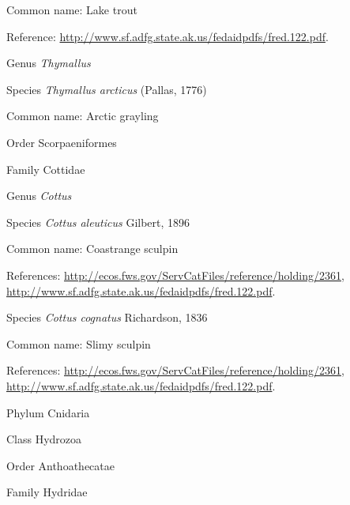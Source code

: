\documentclass[9pt, article]{memoir}
\begin{document}
\begin{multicols}{2}
Common name: Lake trout

Reference: 
\url{http://www.sf.adfg.state.ak.us/fedaidpdfs/fred.122.pdf}.

\vspace{6pt}\noindent\hspace{30pt}Genus \textit{Thymallus}


\vspace{6pt}\noindent\hspace{36pt}Species \textit{Thymallus arcticus} (Pallas, 1776)


Common name: Arctic grayling

\vspace{6pt}\noindent\hspace{18pt}Order Scorpaeniformes


\vspace{6pt}\noindent\hspace{24pt}Family Cottidae


\vspace{6pt}\noindent\hspace{30pt}Genus \textit{Cottus}


\vspace{6pt}\noindent\hspace{36pt}Species \textit{Cottus aleuticus} Gilbert, 1896


Common name: Coastrange sculpin

References: 
\url{http://ecos.fws.gov/ServCatFiles/reference/holding/2361}, 
\url{http://www.sf.adfg.state.ak.us/fedaidpdfs/fred.122.pdf}.

\vspace{6pt}\noindent\hspace{36pt}Species \textit{Cottus cognatus} Richardson, 1836


Common name: Slimy sculpin

References: 
\url{http://ecos.fws.gov/ServCatFiles/reference/holding/2361}, 
\url{http://www.sf.adfg.state.ak.us/fedaidpdfs/fred.122.pdf}.

\vspace{6pt}\noindent\hspace{6pt}Phylum Cnidaria


\vspace{6pt}\noindent\hspace{12pt}Class Hydrozoa


\vspace{6pt}\noindent\hspace{18pt}Order Anthoathecatae


\vspace{6pt}\noindent\hspace{24pt}Family Hydridae



\end{multicols}
\end{document}
